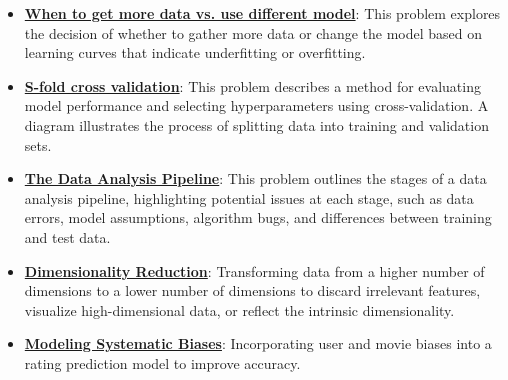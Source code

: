 \documentclass{article}%
\begin{document}
\begin{itemize}[leftmargin=*]
\item \href{https://purdue.brightspace.com/d2l/common/assets/pdfjs-d2l-dist/1.0.14-legacy/web/viewer.html?file=\%2Fcontent\%2Fenforced\%2F1095467-wl.202510.CS.24300.001\%2F10L1-CrossValidation.pdf\%3Fou\%3D1095467\&lang=en-us\&container=d2l-fileviewer-rendered-pdf\&fullscreen=d2l-fileviewer-rendered-pdf-dialog\&height=667#page=21}{\textbf{When to get more data vs. use different model}}: This problem explores the decision of whether to gather more data or change the model based on learning curves that indicate underfitting or overfitting.%
\item \href{https://purdue.brightspace.com/d2l/common/assets/pdfjs-d2l-dist/1.0.14-legacy/web/viewer.html?file=\%2Fcontent\%2Fenforced\%2F1095467-wl.202510.CS.24300.001\%2F10L1-CrossValidation.pdf\%3Fou\%3D1095467\&lang=en-us\&container=d2l-fileviewer-rendered-pdf\&fullscreen=d2l-fileviewer-rendered-pdf-dialog\&height=667#page=25}{\textbf{S-fold cross validation}}: This problem describes a method for evaluating model performance and selecting hyperparameters using cross-validation. A diagram illustrates the process of splitting data into training and validation sets.%
\item \href{https://purdue.brightspace.com/d2l/common/assets/pdfjs-d2l-dist/1.0.14-legacy/web/viewer.html?file=\%2Fcontent\%2Fenforced\%2F1095467-wl.202510.CS.24300.001\%2F10L1-CrossValidation.pdf\%3Fou\%3D1095467\&lang=en-us\&container=d2l-fileviewer-rendered-pdf\&fullscreen=d2l-fileviewer-rendered-pdf-dialog\&height=667#page=26}{\textbf{The Data Analysis Pipeline}}: This problem outlines the stages of a data analysis pipeline, highlighting potential issues at each stage, such as data errors, model assumptions, algorithm bugs, and differences between training and test data.%
\item \href{https://purdue.brightspace.com/d2l/common/assets/pdfjs-d2l-dist/1.0.14-legacy/web/viewer.html?file=\%2Fcontent\%2Fenforced\%2F1095467-wl.202510.CS.24300.001\%2F11L2-svd-pca-recommender.pdf\%3Fou\%3D1095467\&lang=en-us\&container=d2l-fileviewer-rendered-pdf\&fullscreen=d2l-fileviewer-rendered-pdf-dialog\&height=667#page=8}{\textbf{Dimensionality Reduction}}: Transforming data from a higher number of dimensions to a lower number of dimensions to discard irrelevant features, visualize high-dimensional data, or reflect the intrinsic dimensionality.%
\item \href{https://purdue.brightspace.com/d2l/common/assets/pdfjs-d2l-dist/1.0.14-legacy/web/viewer.html?file=\%2Fcontent\%2Fenforced\%2F1095467-wl.202510.CS.24300.001\%2F11L2-svd-pca-recommender.pdf\%3Fou\%3D1095467\&lang=en-us\&container=d2l-fileviewer-rendered-pdf\&fullscreen=d2l-fileviewer-rendered-pdf-dialog\&height=667#page=40}{\textbf{Modeling Systematic Biases}}: Incorporating user and movie biases into a rating prediction model to improve accuracy.%
\end{itemize}
\end{document}
